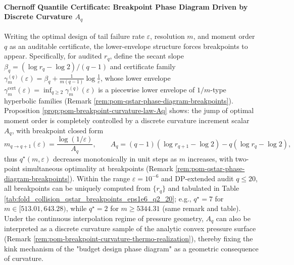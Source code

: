 \paragraph{Chernoff Quantile Certificate: Breakpoint Phase Diagram Driven by Discrete Curvature \texorpdfstring{$A_q$}{Aq}}
Writing the optimal design of tail failure rate \(\varepsilon\), resolution \(m\), and moment order \(q\) as an auditable certificate, the lower-envelope structure forces breakpoints to appear.
Specifically, for audited \(r_q\), define the secant slope \(\beta_q=(\log r_q-\log2)/(q-1)\) and certificate family
\(
\gamma_m^{(q)}(\varepsilon)=\beta_q+\frac{1}{m(q-1)}\log\frac{1}{\varepsilon}
\),
whose lower envelope
\(
\gamma_m^{\mathrm{cert}}(\varepsilon)=\inf_{q\ge 2}\gamma_m^{(q)}(\varepsilon)
\)
is a piecewise lower envelope of \(1/m\)-type hyperbolic families (Remark \ref{rem:pom-qstar-phase-diagram-breakpoints}).
Proposition \ref{prop:pom-breakpoint-curvature-law-Aq} shows: the jump of optimal moment order is completely controlled by a discrete curvature increment scalar \(A_q\),
with breakpoint closed form
\[
m_{q\to q+1}(\varepsilon)=\frac{\log(1/\varepsilon)}{A_q},
\qquad
A_q=(q-1)(\log r_{q+1}-\log2)-q(\log r_q-\log2),
\]
thus \(q^\star(m,\varepsilon)\) decreases monotonically in unit steps as \(m\) increases, with two-point simultaneous optimality at breakpoints (Remark \ref{rem:pom-qstar-phase-diagram-breakpoints}).
Within the range \(\varepsilon=10^{-6}\) and DP-extended audit \(q\le 20\), all breakpoints can be uniquely computed from \(\{r_q\}\) and tabulated in Table \ref{tab:fold_collision_qstar_breakpoints_eps1e6_q2_20};
e.g., \(q^\star=7\) for \(m\in[513.01,643.28)\), while \(q^\star=2\) for \(m\ge 5344.31\) (same remark and table).
Under the continuous interpolation regime of pressure geometry, \(A_q\) can also be interpreted as a discrete curvature sample of the analytic convex pressure surface (Remark \ref{rem:pom-breakpoint-curvature-thermo-realization}), thereby fixing the kink mechanism of the "budget design phase diagram" as a geometric consequence of curvature.

